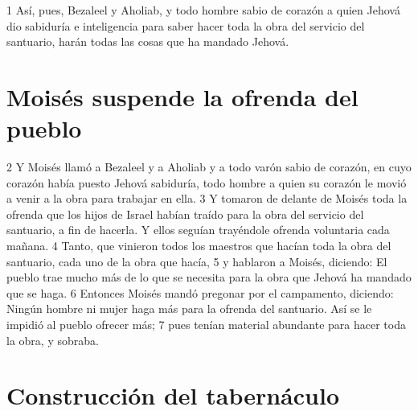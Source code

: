 1 Así, pues, Bezaleel y Aholiab, y todo hombre sabio de corazón a quien Jehová dio sabiduría e inteligencia para saber hacer toda la obra del servicio del santuario, harán todas las cosas que ha mandado Jehová.

\section*{Moisés suspende la ofrenda del pueblo}

2 Y Moisés llamó a Bezaleel y a Aholiab y a todo varón sabio de corazón, en cuyo corazón había puesto Jehová sabiduría, todo hombre a quien su corazón le movió a venir a la obra para trabajar en ella.
3 Y tomaron de delante de Moisés toda la ofrenda que los hijos de Israel habían traído para la obra del servicio del santuario, a fin de hacerla. Y ellos seguían trayéndole ofrenda voluntaria cada mañana.
4 Tanto, que vinieron todos los maestros que hacían toda la obra del santuario, cada uno de la obra que hacía,
5 y hablaron a Moisés, diciendo: El pueblo trae mucho más de lo que se necesita para la obra que Jehová ha mandado que se haga.
6 Entonces Moisés mandó pregonar por el campamento, diciendo: Ningún hombre ni mujer haga más para la ofrenda del santuario. Así se le impidió al pueblo ofrecer más;
7 pues tenían material abundante para hacer toda la obra, y sobraba.

\section*{Construcción del tabernáculo}

